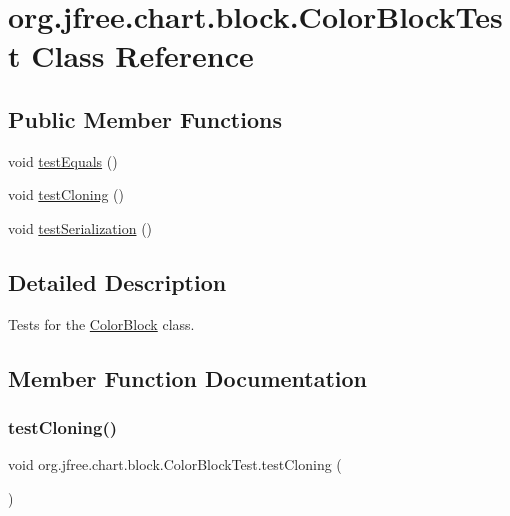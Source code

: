 \hypertarget{classorg_1_1jfree_1_1chart_1_1block_1_1_color_block_test}{}\section{org.\+jfree.\+chart.\+block.\+Color\+Block\+Test Class Reference}
\label{classorg_1_1jfree_1_1chart_1_1block_1_1_color_block_test}
\subsection*{Public Member Functions}
\begin{DoxyCompactItemize}
\item 
void \mbox{\hyperlink{classorg_1_1jfree_1_1chart_1_1block_1_1_color_block_test_a3ffdd6a74df7d3a232628408deaa40c0}{test\+Equals}} ()
\item 
void \mbox{\hyperlink{classorg_1_1jfree_1_1chart_1_1block_1_1_color_block_test_afae370181d7a410a1bcd5b4a01a96357}{test\+Cloning}} ()
\item 
void \mbox{\hyperlink{classorg_1_1jfree_1_1chart_1_1block_1_1_color_block_test_a745bea231409bc618d218db91869db97}{test\+Serialization}} ()
\end{DoxyCompactItemize}


\subsection{Detailed Description}
Tests for the \mbox{\hyperlink{classorg_1_1jfree_1_1chart_1_1block_1_1_color_block}{Color\+Block}} class. 

\subsection{Member Function Documentation}
\mbox{\label{classorg_1_1jfree_1_1chart_1_1block_1_1_color_block_test_afae370181d7a410a1bcd5b4a01a96357}} 
\subsubsection{\texorpdfstring{test\+Cloning()}{testCloning()}}
{\footnotesize\ttfamily void org.\+jfree.\+chart.\+block.\+Color\+Block\+Test.\+test\+Cloning (\begin{DoxyParamCaption}{ }\end{DoxyParamCaption})}

